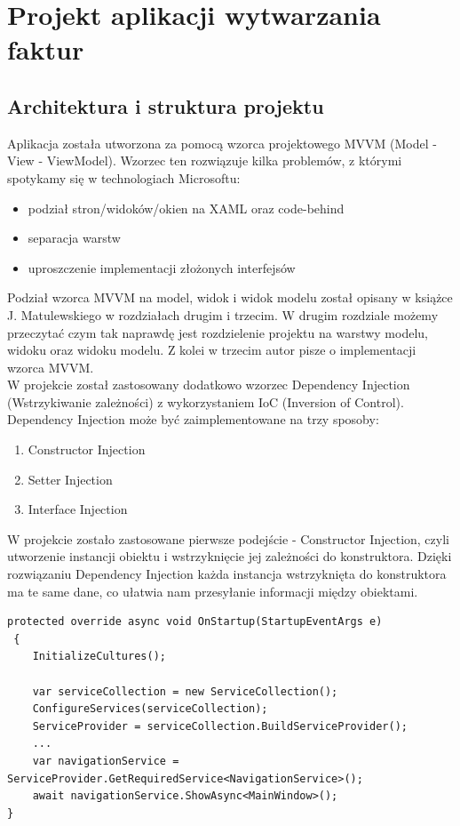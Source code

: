 \chapter{Projekt aplikacji wytwarzania faktur}

\section{Architektura i struktura projektu}
Aplikacja została utworzona za pomocą wzorca projektowego MVVM (Model - View - ViewModel). Wzorzec ten rozwiązuje kilka problemów, z którymi spotykamy się w technologiach Microsoftu:

\begin{itemize}
    \item podział stron/widoków/okien na XAML oraz code-behind
    \item separacja warstw
    \item uproszczenie implementacji złożonych interfejsów
\end{itemize}

Podział wzorca MVVM na model, widok i widok modelu został opisany w książce J. Matulewskiego \cite{MVVMBook} w rozdziałach drugim i trzecim. W drugim rozdziale możemy przeczytać czym tak naprawdę jest rozdzielenie projektu na warstwy modelu, widoku oraz widoku modelu. Z kolei w trzecim autor pisze o implementacji wzorca MVVM. \\
W projekcie został zastosowany dodatkowo wzorzec Dependency Injection (Wstrzykiwanie zależności) z wykorzystaniem IoC (Inversion of Control). Dependency Injection może być zaimplementowane na trzy sposoby:

\begin{enumerate}
    \item Constructor Injection
    \item Setter Injection
    \item Interface Injection
\end{enumerate}

W projekcie zostało zastosowane pierwsze podejście - Constructor Injection, czyli utworzenie instancji obiektu i wstrzyknięcie jej zależności do konstruktora. Dzięki rozwiązaniu Dependency Injection każda instancja wstrzyknięta do konstruktora ma te same dane, co ułatwia nam przesyłanie informacji między obiektami.

\begin{lstlisting}[language={[Sharp]C},label=list:DIinit,caption=Inicjalizacja dependency injection, basicstyle=\footnotesize\ttfamily]
protected override async void OnStartup(StartupEventArgs e)
 {
    InitializeCultures();
    
    var serviceCollection = new ServiceCollection();
    ConfigureServices(serviceCollection);
    ServiceProvider = serviceCollection.BuildServiceProvider();
    ...
    var navigationService = ServiceProvider.GetRequiredService<NavigationService>();
    await navigationService.ShowAsync<MainWindow>();
}
\end{lstlisting}

